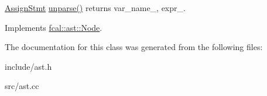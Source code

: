\hyperlink{classfcal_1_1ast_1_1AssignStmt}{Assign\+Stmt} \hyperlink{classfcal_1_1ast_1_1AssignStmt_ae58f8af8bc26ae0994d95ae266433ded}{unparse()} returns var\+\_\+name\+\_\+, expr\+\_\+. 

Implements \hyperlink{classfcal_1_1ast_1_1Node_a81865f5a1df593708a39bf492952742a}{fcal\+::ast\+::\+Node}.



The documentation for this class was generated from the following files\+:\begin{DoxyCompactItemize}
\item 
include/ast.\+h\item 
src/ast.\+cc\end{DoxyCompactItemize}
